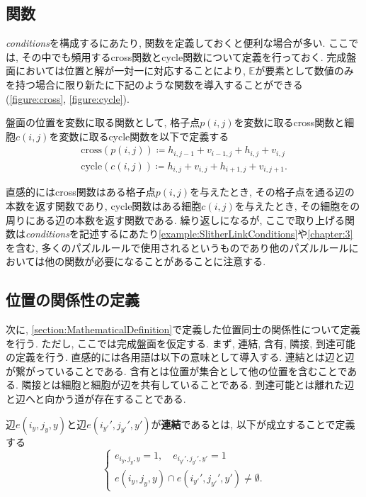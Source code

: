 \subsection{関数}\label{subsection:Function}
\textit{conditions}を構成するにあたり, 関数を定義しておくと便利な場合が多い. ここでは, その中でも頻用するcross関数とcycle関数について定義を行っておく.
完成盤面においては位置と解が一対一に対応することにより, $\mathbb{E}$が要素として数値のみを持つ場合に限り新たに下記のような関数を導入することができる(\cref{figure:cross}, \cref{figure:cycle}).

\begin{definition}\label{definition:Function}
  盤面の位置を変数に取る関数として, 格子点$p(i,j)$を変数に取るcross関数と細胞$c(i,j)$を変数に取るcycle関数を以下で定義する
  \begin{align}
    \text{cross}(p(i,j))\coloneqq h_{i,j-1}+v_{i-1,j}+h_{i,j}+v_{i,j} \\
    \text{cycle}(c(i,j))\coloneqq h_{i,j}+v_{i,j}+h_{i+1,j}+v_{i,j+1}.
  \end{align}
\end{definition}

直感的にはcross関数はある格子点$p(i,j)$を与えたとき, その格子点を通る辺の本数を返す関数であり, cycle関数はある細胞$c(i,j)$を与えたとき, その細胞をの周りにある辺の本数を返す関数である.
繰り返しになるが, ここで取り上げる関数は\textit{conditions}を記述するにあたり\cref{example:SlitherLinkConditions}や\cref{chapter:3}を含む, 多くのパズルルールで使用されるというものであり他のパズルルールにおいては他の関数が必要になることがあることに注意する.

\subsection{位置の関係性の定義}\label{subsection:RelationDefinition}

次に, \cref{section:MathematicalDefinition}で定義した位置同士の関係性について定義を行う. ただし, ここでは完成盤面を仮定する.
まず, 連結, 含有, 隣接, 到達可能の定義を行う.
直感的には各用語は以下の意味として導入する.
連結とは辺と辺が繋がっていることである.
含有とは位置が集合として他の位置を含むことである.
隣接とは細胞と細胞が辺を共有していることである.
到達可能とは離れた辺と辺へと向かう道が存在することである.

\begin{definition}[連結]\label{definition:Connection}
  辺$e(i_y,j_y,y)$と辺$e(i_{y'}',j_{y'}',y')$が\textbf{連結}であるとは, 以下が成立することで定義する
  \begin{equation}
    \begin{cases}
      {e_{i_y,j_y,y}=1,\quad e_{i_{y'}',j_{y'}',y'}  =     1          } \\
      {e(i_y,j_y,y)\cap e(i_{y'}',j_{y'}',y')  \neq  \emptyset}.
    \end{cases}
  \end{equation}
\end{definition}

